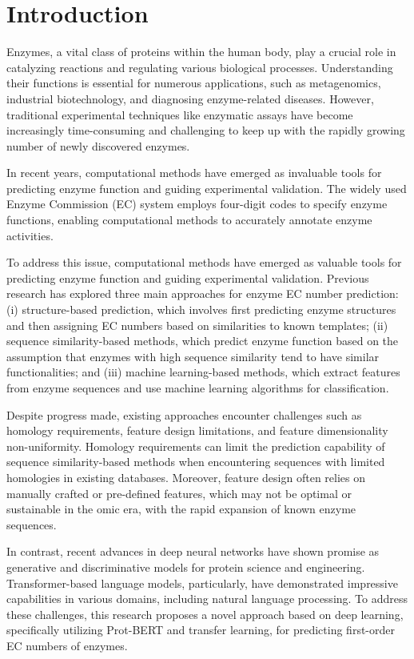 \documentclass[conference]{IEEEtran}
\begin{document}
\vspace{3cm}

\section{Introduction}


Enzymes, a vital class of proteins within the human body, play a crucial role in catalyzing reactions and regulating various biological processes. Understanding their functions is essential for numerous applications, such as metagenomics, industrial biotechnology, and diagnosing enzyme-related diseases. However, traditional experimental techniques like enzymatic assays have become increasingly time-consuming and challenging to keep up with the rapidly growing number of newly discovered enzymes.

In recent years, computational methods have emerged as invaluable tools for predicting enzyme function and guiding experimental validation. The widely used Enzyme Commission (EC) system employs four-digit codes to specify enzyme functions, enabling computational methods to accurately annotate enzyme activities.

To address this issue, computational methods have emerged as valuable tools for predicting enzyme function and guiding experimental validation. Previous research has explored three main approaches for enzyme EC number prediction: (i) structure-based prediction, which involves first predicting enzyme structures and then assigning EC numbers based on similarities to known templates; (ii) sequence similarity-based methods, which predict enzyme function based on the assumption that enzymes with high sequence similarity tend to have similar functionalities; and (iii) machine learning-based methods, which extract features from enzyme sequences and use machine learning algorithms for classification.

Despite progress made, existing approaches encounter challenges such as homology requirements, feature design limitations, and feature dimensionality non-uniformity. Homology requirements can limit the prediction capability of sequence similarity-based methods when encountering sequences with limited homologies in existing databases. Moreover, feature design often relies on manually crafted or pre-defined features, which may not be optimal or sustainable in the omic era, with the rapid expansion of known enzyme sequences.

In contrast, recent advances in deep neural networks have shown promise as generative and discriminative models for protein science and engineering. Transformer-based language models, particularly, have demonstrated impressive capabilities in various domains, including natural language processing. To address these challenges, this research proposes a novel approach based on deep learning, specifically utilizing Prot-BERT and transfer learning, for predicting first-order EC numbers of enzymes.
\end{document}
